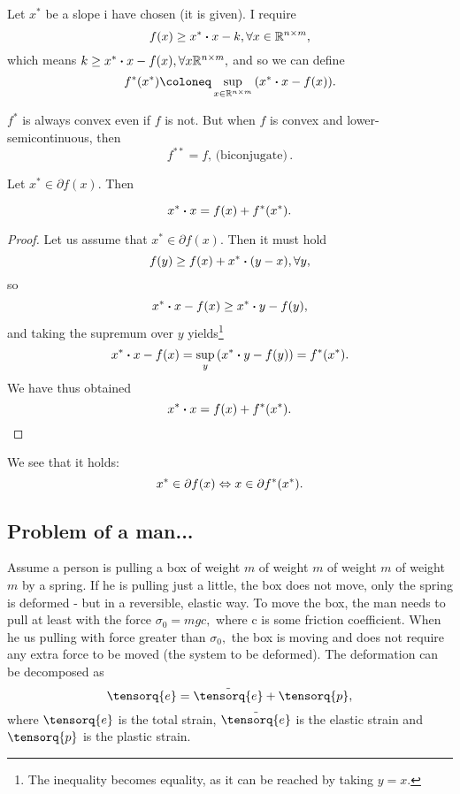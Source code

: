 \documentclass[11pt]{scrartcl} %
\begin{document}
\begin{definition}
Let $x^{*}$ be a slope i have chosen (it is given). I require
\[
	f(x) \geq x^{*} \vdot x - k, \forall x \in \R^{n \times m},
\]
which means $k \geq x^{*} \vdot x - f(x), \forall x\R^{n \times m},$ and so we can define
\[
	f^{*}\qty(x^{*}) \coloneq \sup_{x \in \R^{n \times m}}\qty(x^{*} \vdot x - f(x)).
\]
\end{definition}

\begin{remark}
	$f^{*}$ is always convex even if $f$ is not. But when $f$ is convex and lower-semicontinuous, then
	\[
		f^{**} = f, \, \text{(biconjugate)} \,.
	\]
\end{remark}

\begin{theorem}
Let $x^{*} \in \partial f(x).$ Then

\[
	x^{*} \vdot x = f(x) + f^{*}(x^{*}).
\]
\begin{proof}
Let us assume that $x^{*} \in \partial f(x)$. Then it must hold
\[
	f(y) \geq f(x) + x^{*} \vdot \qty(y-x), \forall y,
\]
so
\[
	x^{*} \vdot x - f(x) \geq x^{*} \vdot y - f\qty(y),
\]
and taking the supremum over $y$ yields\footnote{The inequality becomes equality, as it can be reached by taking $y=x$.}
\[
	x^{*} \vdot x -f (x) = \sup_y \qty(x^{*} \vdot y - f(y)) = f^{*}\qty(x^{*}).
\]
We have thus obtained
\[
	x^{*} \vdot x = f(x) + f^{*}(x^{*}).
\]

\end{proof}
\end{theorem}

\begin{remark}
	We see that it holds:
	\[
		x^{*} \in \partial f(x) \Leftrightarrow x \in \partial f^{*}\qty(x^{*}).
	\]
\end{remark}

\subsection{Problem of a man...}
\label{sec:problem}

Assume a person is pulling a box of weight $m$ of weight $m$ of weight $m$ of weight $m$ by a spring. If he is pulling just a little, the box does not move, only the spring is deformed - but in a reversible, elastic way.
To move the box, the man needs to pull at least with the force $\sigma_0 = mgc,$ where c is some friction coefficient. When he us pulling with force greater than $\sigma_0,$ the box is moving and does not require any extra force to be moved (the system to be deformed). The deformation can be decomposed as
\[
	\tensorq{e} = \tilde{\tensorq{e}} + \tensorq{p},
\]
where $\tensorq{e}$ is the total strain, $\tilde{\tensorq{e}}$ is the elastic strain and $\tensorq{p}$ is the plastic strain.
\end{document}
